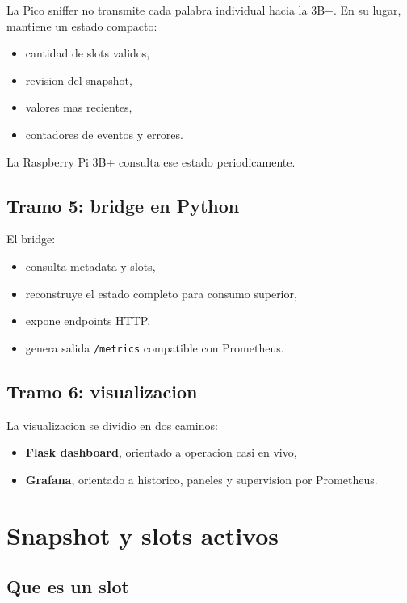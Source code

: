 \documentclass[12pt,a4paper]{report}
\begin{document}
La Pico sniffer no transmite cada palabra individual hacia la 3B+. En su lugar, mantiene un estado compacto:

\begin{itemize}
    \item cantidad de slots validos,
    \item revision del snapshot,
    \item valores mas recientes,
    \item contadores de eventos y errores.
\end{itemize}

La Raspberry Pi 3B+ consulta ese estado periodicamente.

\section{Tramo 5: bridge en Python}

El bridge:

\begin{itemize}
    \item consulta metadata y slots,
    \item reconstruye el estado completo para consumo superior,
    \item expone endpoints HTTP,
    \item genera salida \texttt{/metrics} compatible con Prometheus.
\end{itemize}

\section{Tramo 6: visualizacion}

La visualizacion se dividio en dos caminos:

\begin{itemize}
    \item \textbf{Flask dashboard}, orientado a operacion casi en vivo,
    \item \textbf{Grafana}, orientado a historico, paneles y supervision por Prometheus.
\end{itemize}

\chapter{Snapshot y slots activos}

\section{Que es un slot}
\end{document}
